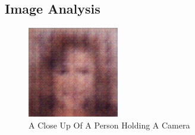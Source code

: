 \documentclass{article}%
\begin{document}
%
\subsection{Image Analysis}%
\label{subsec:ImageAnalysis}%


\begin{figure}[h!]%
\centering%
\includegraphics[width=150px]{500_fake_images/samples_5_244.png}%
\caption{A Close Up Of A Person Holding A Camera}%
\end{figure}

%
\end{document}
